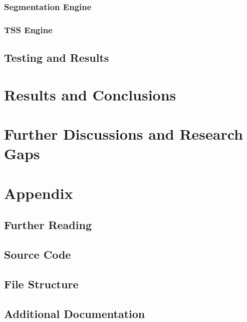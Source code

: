 \documentclass[11pt,twoside]{report}
\begin{document}
\subsection{Segmentation Engine}

\subsection{TSS Engine}

\section{Testing and Results}

\chapter{Results and Conclusions}
\label{chap:results}

\chapter{Further Discussions and Research Gaps}
\label{chap:discussion}

\appendix
\chapter{Appendix}
\label{chap:appendix}
\section{Further Reading}

\section{Source Code}

\section{File Structure}

\section{Additional Documentation}



\end{document}
